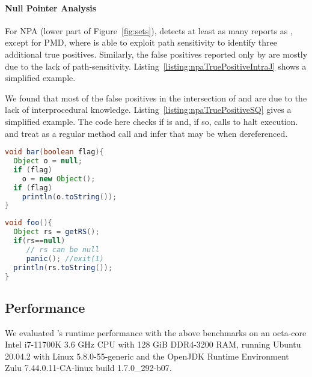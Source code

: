\paragraph{Null Pointer Analysis}
For NPA (lower part of Figure~\ref{fig:sets}),  detects at least as many reports as , except for PMD,
where  is able to exploit path sensitivity to identify three additional true positives.
Similarly, the false positives reported only by  are mostly due to the lack of path-sensitivity.
Listing~\ref{listing:npaTruePositiveIntraJ} shows a simplified example.

We found that most of the false positives in the intersection of  and  are due to the lack of interprocedural knowledge.
Listing~\ref{listing:npaTruePositiveSQ} gives a simplified example.
The code here checks if  is  and, if so, calls  to halt execution.
 and  treat  as a regular method call and infer that  may be  when dereferenced.

\noindent
\begin{minipage}{0.23\textwidth}
\begin{lstlisting}[caption={Simplified false positive reported by {\intraj} }, language=Java, captionpos=b, label=listing:npaTruePositiveIntraJ]
void bar(boolean flag){
  Object o = null;
  if (flag)
    o = new Object();
  if (flag)
    println(o.toString());
}
\end{lstlisting}
\end{minipage}%
\hfill
\begin{minipage}{0.23\textwidth}
\begin{lstlisting}[caption={False positive due to intraprocedural limitations}, language=Java, captionpos=b, label=listing:npaTruePositiveSQ]
void foo(){
  Object rs = getRS();
  if(rs==null)
     // rs can be null
     panic(); //exit(1)
  println(rs.toString());
}
\end{lstlisting}
\end{minipage}%

\subsection{Performance}
We evaluated {\intraj}'s runtime performance with the above benchmarks
on an octa-core Intel i7-11700K 3.6 GHz CPU with 128 GiB DDR4-3200 RAM, running Ubuntu 20.04.2 with Linux 5.8.0-55-generic
and the OpenJDK Runtime Environment Zulu 7.44.0.11-CA-linux build 1.7.0\_292-b07.

